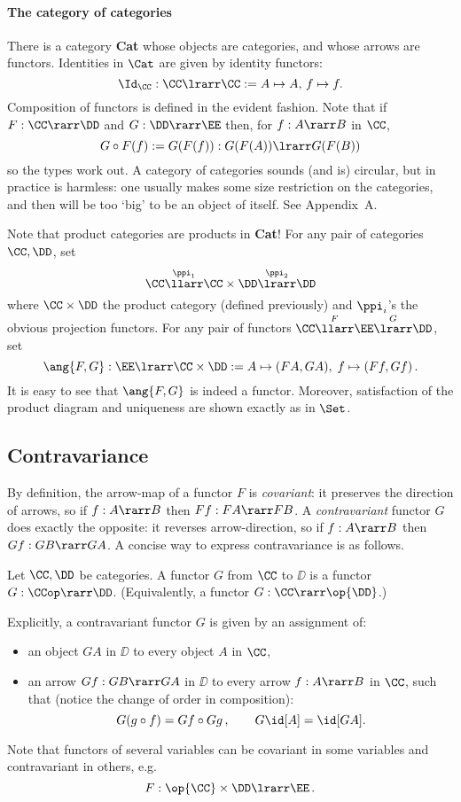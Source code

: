 \documentclass[12pt]{article}
\begin{document}
\paragraph{The category of categories}
There is a category \textbf{Cat} whose objects are categories, and whose arrows are functors. Identities in $\Cat$ are given by identity functors:
\[ \Id_\CC:\CC\lrarr\CC:=A\mapsto A,\, f\mapsto f. \]
Composition of functors is defined in the evident
fashion. Note that if $F:\CC \rarr \DD$ and $G : \DD \rarr \EE$ then, for $f : A \rarr B$ in $\CC$,
\[ G \circ F (f) := G(F(f)) : G(F(A))  \lrarr G(F(B)) \]
so the types work out.
%
A category of categories sounds (and is) circular, but in practice is harmless: one usually makes some size restriction on the categories, and then  will be too `big' to be an object of itself. See Appendix~A.

Note that product categories are products in \textbf{Cat}! For any pair of categories $\CC,\DD$, set
\[ \CC\overset{\ppi_1}{\llarr}\CC\times\DD\overset{\ppi_2}{\lrarr}\DD \]
where $\CC\times\DD$ the product category (defined previously) and $\ppi_i$'s the obvious projection functors. For any pair of functors
$\CC\overset{F}{\llarr}\EE\overset{G}{\lrarr}\DD$, set
\[ \ang{F,G}:\EE\lrarr\CC\times \DD:=A\mapsto(FA,GA),\;f\mapsto(Ff,Gf)\,. \]
It is easy to see that $\ang{F,G}$ is indeed a functor. Moreover, satisfaction of the product diagram and uniqueness are shown exactly as in $\Set$.

\subsection{Contravariance}
By definition, the arrow-map of a functor $F$ is \emph{covariant}: it preserves the direction of arrows, so if $f:A\rarr B$ then $Ff:FA\rarr FB$. A
\emph{contravariant} functor $G$ does exactly the opposite: it reverses arrow-direction, so if $f:A\rarr B$ then $Gf:GB\rarr GA$. A concise way to
express contravariance is as follows.

\begin{mydefinition}
Let $\CC,\DD$ be categories. A  functor $G$ from $\CC$ to $\DD$ is a functor $G:\CCop\rarr\DD$.
(Equivalently, a functor $G : \CC \rarr \op{\DD}$.)\deq
\end{mydefinition}
%
Explicitly, a contravariant functor $G$ is given by an assignment of:
\begin{itemize}
\item an object $GA$ in $\DD$ to every object $A$ in $\CC$,
\item an arrow $Gf:GB\rarr GA$ in $\DD$ to every arrow $f:A\rarr B$ in $\CC$, such that (notice the change of order in composition):
\[ G(g \circ f) = Gf \circ Gg\,,\qquad G \id[A] = \id[GA] . \]
\end{itemize}
%
Note that functors of several variables  can be covariant in some variables and contravariant in others, e.g.
\[ F : \op{\CC} \times \DD \lrarr \EE\, . \]
\end{document}
